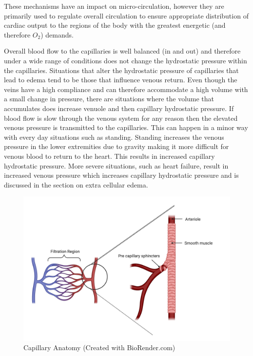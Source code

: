These mechanisms have an impact on micro-circulation, however they are primarily used to regulate overall circulation to ensure appropriate distribution of cardiac output to the regions of the body with the greatest energetic (and therefore $O_2$) demands.

Overall blood flow to the capillaries is well balanced (in and out) and therefore under a wide range of conditions does not change the hydrostatic pressure within the capillaries. Situations that alter the hydrostatic pressure of capillaries that lead to edema tend to be those that influence venous return. Even though the veins have a high compliance and can therefore accommodate a high volume with a small change in pressure, there are situations where the volume that accumulates does increase venuole and then capillary hydrostatic pressure. If blood flow is slow through the venous system for any reason then the elevated venous pressure is transmitted to the capillaries. This can happen in a minor way with every day situations such as standing. Standing increases the venous pressure in the lower extremities due to gravity making it more difficult for venous blood to return to the heart. This results in increased capillary hydrostatic pressure. More severe situations, such as heart failure, result in increased venous pressure which increases capillary hydrostatic pressure and is discussed in the section on extra cellular edema.

\begin{figure}[!h]
    \centering
    \includegraphics[width=0.7\linewidth]{./figure/capillaries.png}
    \caption{Capillary Anatomy \footnotesize{(Created with BioRender.com)}}
    \label{fig:capillaries}
\end{figure}

